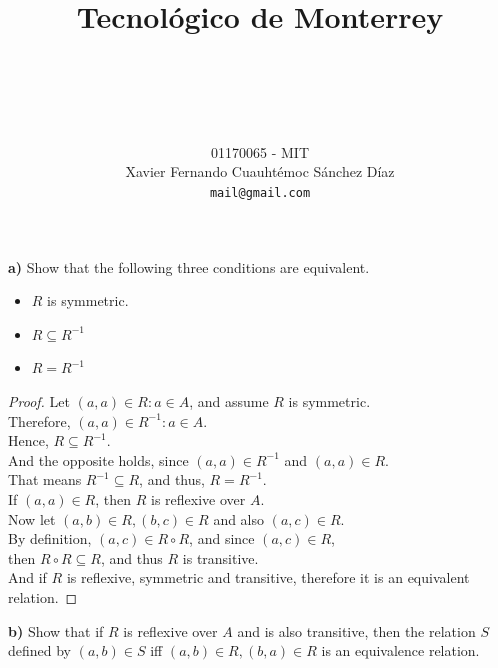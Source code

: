 \documentclass[titlepage, letterpaper, fleqn]{article}
\title{
\vspace{1in}
\textbf{Tecnológico de Monterrey} \\
\vspace{0.5in}
\textmd{\mahclass} \\
\large{\textit{\mahteacher}} \\
\vspace{0.5in}
\textsc{\mahtitle}
\author{01170065  - MIT \\
Xavier Fernando Cuauhtémoc Sánchez Díaz \\
\texttt{mail@gmail.com}}
\date{\mahdate}
}
\newcommand{\spacepls}{\vspace{5mm}}
\begin{document}
\begin{titlepage}
\maketitle
\end{titlepage}

%
%

{\large \textbf{a)} Show that the following three conditions are equivalent.}

\begin{itemize}
	\item \(R\) is symmetric.
	\item \(R \subseteq R^{-1}\)
	\item \(R = R^{-1}\)
\end{itemize}

\begin{proof}
Let \((a,a) \in R : a \in A\), and assume \(R\) is symmetric.\\
Therefore, \((a,a) \in R^{-1} : a \in A\).\\
Hence, \(R \subseteq R^{-1}\).\\
And the opposite holds, since \((a,a) \in R^{-1}\) and \((a,a) \in R\).\\
That means \(R^{-1} \subseteq R\), and thus, \(R = R^{-1}\).\\
If \((a,a) \in R\), then \(R\) is reflexive over \(A\).\\
Now let \((a,b) \in R, (b,c) \in R\) and also \((a,c) \in R\).\\
By definition, \((a,c) \in R \circ R\), and since \((a,c) \in R\),\\
then \(R \circ R \subseteq R\), and thus \(R\) is transitive.\\
And if \(R\) is reflexive, symmetric and transitive, therefore it is an equivalent relation.
\end{proof}

\spacepls

{\large \textbf{b)} Show that if \(R\) is reflexive over \(A\) and is also transitive, then the relation \(S\) defined by \((a,b) \in S\) iff \((a,b) \in R, (b,a) \in R\) is an equivalence relation.}
\end{document}
